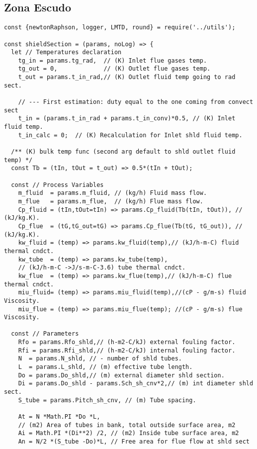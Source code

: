 \subsection{Zona Escudo}
\begin{verbatim}
const {newtonRaphson, logger, LMTD, round} = require('../utils');

const shieldSection = (params, noLog) => {
  let // Temperatures declaration
    tg_in = params.tg_rad,  // (K) Inlet flue gases temp.
    tg_out = 0,             // (K) Outlet flue gases temp.
    t_out = params.t_in_rad,// (K) Outlet fluid temp going to rad sect.

    // --- First estimation: duty equal to the one coming from convect sect
    t_in = (params.t_in_rad + params.t_in_conv)*0.5, // (K) Inlet fluid temp.
    t_in_calc = 0;  // (K) Recalculation for Inlet shld fluid temp.

  /** (K) bulk temp func (second arg default to shld outlet fluid temp) */
  const Tb = (tIn, tOut = t_out) => 0.5*(tIn + tOut);

  const // Process Variables
    m_fluid  = params.m_fluid, // (kg/h) Fluid mass flow.
    m_flue   = params.m_flue,  // (kg/h) Flue mass flow.
    Cp_fluid = (tIn,tOut=tIn) => params.Cp_fluid(Tb(tIn, tOut)), // (kJ/kg.K).
    Cp_flue  = (tG,tG_out=tG) => params.Cp_flue(Tb(tG, tG_out)), // (kJ/kg.K).
    kw_fluid = (temp) => params.kw_fluid(temp),// (kJ/h-m-C) fluid thermal cndct.
    kw_tube  = (temp) => params.kw_tube(temp),
    // (kJ/h-m-C ->J/s-m-C-3.6) tube thermal cndct.
    kw_flue  = (temp) => params.kw_flue(temp),// (kJ/h-m-C) flue thermal cndct.
    miu_fluid= (temp) => params.miu_fluid(temp),//(cP - g/m-s) fluid Viscosity.
    miu_flue = (temp) => params.miu_flue(temp); //(cP - g/m-s) flue Viscosity.

  const // Parameters
    Rfo = params.Rfo_shld,// (h-m2-C/kJ) external fouling factor.
    Rfi = params.Rfi_shld,// (h-m2-C/kJ) internal fouling factor.
    N  = params.N_shld, // - number of shld tubes.
    L  = params.L_shld, // (m) effective tube length.
    Do = params.Do_shld,// (m) external diameter shld section.
    Di = params.Do_shld - params.Sch_sh_cnv*2,// (m) int diameter shld sect.
    S_tube = params.Pitch_sh_cnv, // (m) Tube spacing.

    At = N *Math.PI *Do *L,   
    // (m2) Area of tubes in bank, total outside surface area, m2
    Ai = Math.PI *(Di**2) /2, // (m2) Inside tube surface area, m2
    An = N/2 *(S_tube -Do)*L, // Free area for flue flow at shld sect
    

\end{verbatim}
